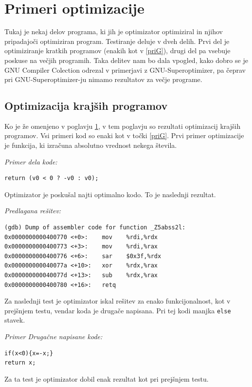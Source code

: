 \documentclass[a4paper, 12pt]{book}
\begin{document}
\section{Primeri optimizacije}
\label{priG3}
Tukaj je nekaj delov programa, ki jih je optimizator optimiziral in njihov pripadajoči optimiziran program. Testiranje deluje v dveh delih. Prvi del je optimiziranje kratkih programov (enakih kot v \ref{priG}), drugi del pa vsebuje poskuse na večjih programih. Taka delitev nam bo dala vpogled, kako dobro se je GNU Compiler Colection odrezal v primerjavi z GNU-Superoptimizer, pa čeprav pri GNU-Superoptimizer-ju nimamo rezultatov za večje programe.
\subsection{Optimizacija krajših programov}
\label{rez}
Ko je že omenjeno v poglavju \ref{priG3}, v tem poglavju so rezultati optimizacij krajših programov. Vsi primeri kod so enaki kot v točki \ref{priG}. Prvi primer optimizacije je funkcija, ki izračuna absolutno vrednost nekega števila. 
\medskip

\noindent
{\it Primer dela kode:}
\begin{Verbatim}[baselinestretch=1]
return (v0 < 0 ? -v0 : v0);
\end{Verbatim}

Optimizator je poskušal najti optimalno kodo. To je naslednji rezultat. 
\medskip

\noindent
{\it Predlagana rešitev:}
\begin{Verbatim}[baselinestretch=1]
(gdb) Dump of assembler code for function _Z5abss2l:
0x0000000000400770 <+0>: 	mov    %rdi,%rdx
0x0000000000400773 <+3>: 	mov    %rdi,%rax
0x0000000000400776 <+6>: 	sar    $0x3f,%rdx
0x000000000040077a <+10>:	xor    %rdx,%rax
0x000000000040077d <+13>:	sub    %rdx,%rax
0x0000000000400780 <+16>:	retq 
\end{Verbatim}

Za naslednji test je optimizator iskal rešitev za enako funkcijonalnost, kot v prejšnjem testu, vendar koda je drugače napisana. Pri tej kodi manjka \texttt{else} stavek.
\medskip

\noindent
{\it Primer Drugačne napisane kode:}
\begin{Verbatim}[baselinestretch=1]
if(x<0){x=-x;}
return x;
\end{Verbatim}

Za ta test je optimizator dobil enak rezultat kot pri prejšnjem testu.
\end{document}
